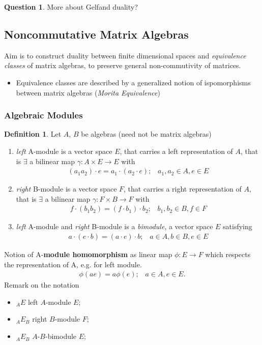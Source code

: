 \documentclass[a4paper]{article}
\theoremstyle{definition}
\newtheorem{definition}{Definition}
\theoremstyle{definition}
\newtheorem{question}{Question}
\theoremstyle{theorem}
\theoremstyle{theorem}
\theoremstyle{definition}
\begin{document}
\begin{question}
    More about Gelfand duality?
\end{question}

\subsection{Noncommutative Matrix Algebras}
Aim is to construct duality between finite dimensional spaces and \textit{equivalence classes}
of matrix algebras, to preserve general non-commutivity of matrices.
\begin{itemize}
    \item Equivalence classes are described by a generalized notion of ispomorphisms between matrix
        algebras (\textit{Morita Equivalence})
\end{itemize}

\subsubsection{Algebraic Modules}
\begin{definition}
    Let $A$, $B$ be algebras (need not be matrix algebras)
    \begin{enumerate}
        \item \textit{left} A-module is a vector space $E$, that carries a left representation of $A$,
            that is $\exists$ a bilinear map $\gamma: A \times E \rightarrow E$ with
            \begin{align*}
                (a_1a_2)\cdot e = a_1 \cdot (a_2 \cdot e);\;\;\; a_1, a_2 \in A, e \in E
            \end{align*}
        \item \textit{right} B-module is a vector space $F$, that carries a right representation of $A$,
            that is $\exists$ a bilinear map $\gamma: F \times B \rightarrow F$ with
            \begin{align*}
                f \cdot (b_1b_2)= (f \cdot b_1) \cdot b_2;\;\;\; b_1, b_2 \in B, f \in F
            \end{align*}
        \item \textit{left} A-module and \textit{right} B-module is a \textit{bimodule}, a vector space $E$
            satisfying
            \begin{align*}
                a \cdot (e \cdot b)= (a \cdot e) \cdot b;\;\;\;  a \in A, b \in B, e \in E
            \end{align*}
    \end{enumerate}
\end{definition}
Notion of A-\textbf{module homomorphism} as linear map $\phi: E\rightarrow F$ which respects the
representation of A, e.g. for left module.
\begin{align*}
    \phi (ae) = a \phi (e); \;\;\; a \in A, e \in E.
\end{align*}
Remark on the notation
\begin{itemize}
    \item ${}_A E$ left $A$-module $E$;
    \item ${}_A E_B$ right $B$-module $F$;
    \item ${}_A E_B$ $A$-$B$-bimodule $E$;
\end{itemize}
\end{document}
